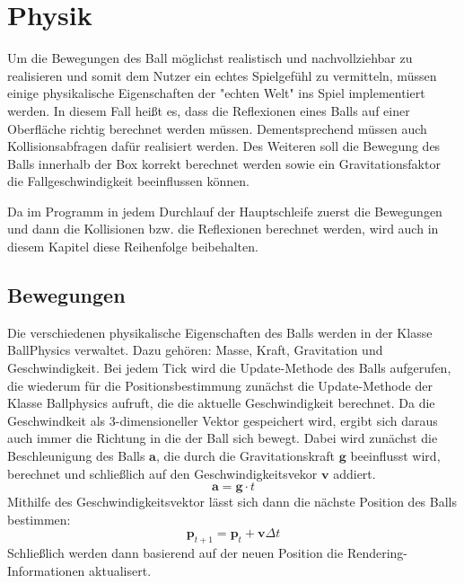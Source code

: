 \chapter{Physik}
\label{Kapitel 4}

Um die Bewegungen des Ball möglichst realistisch und nachvollziehbar zu realisieren und somit dem Nutzer ein echtes Spielgefühl zu vermitteln, müssen einige physikalische Eigenschaften der "{}echten Welt"{} ins Spiel implementiert werden. In diesem Fall heißt es, dass die Reflexionen eines Balls auf einer Oberfläche richtig berechnet werden müssen. Dementsprechend müssen auch Kollisionsabfragen dafür realisiert werden. Des Weiteren soll die Bewegung des Balls innerhalb der Box korrekt berechnet werden sowie ein Gravitationsfaktor die Fallgeschwindigkeit beeinflussen können.

Da im Programm in jedem Durchlauf der Hauptschleife zuerst die Bewegungen und dann die Kollisionen bzw. die Reflexionen berechnet werden, wird auch in diesem Kapitel diese Reihenfolge beibehalten.
\section{Bewegungen}
\label{Kapitel_4_-_Unterkapitel_1}
Die verschiedenen physikalische Eigenschaften des Balls werden in der Klasse BallPhysics verwaltet. Dazu gehören: Masse, Kraft, Gravitation und Geschwindigkeit.
Bei jedem Tick wird die Update-Methode des Balls aufgerufen, die wiederum für die Positionsbestimmung zunächst die Update-Methode der Klasse Ballphysics aufruft, die die aktuelle Geschwindigkeit berechnet. Da die Geschwindkeit als 3-dimensioneller Vektor gespeichert wird, ergibt sich daraus auch immer die Richtung in die der Ball sich bewegt. Dabei wird zunächst die Beschleunigung des Balls $\mathbf{a}$, die durch die Gravitationskraft $\mathbf{g}$ beeinflusst wird, berechnet und schließlich auf den Geschwindigkeitsvekor $\mathbf{v}$ addiert.
 \begin{equation}
	    \label{beschleunigung}
	    \mathbf{a} = \mathbf{g} \cdot t 
    \end{equation}
Mithilfe des Geschwindigkeitsvektor lässt sich dann die nächste Position des Balls bestimmen:
\begin{equation}
	    \label{beschleunigung}
	   \mathbf{p}_{t+1} = \mathbf{p}_{t} + \mathbf{v}\Delta t 
    \end{equation}
Schließlich werden dann basierend auf der neuen Position die Rendering-Informationen aktualisert. 


